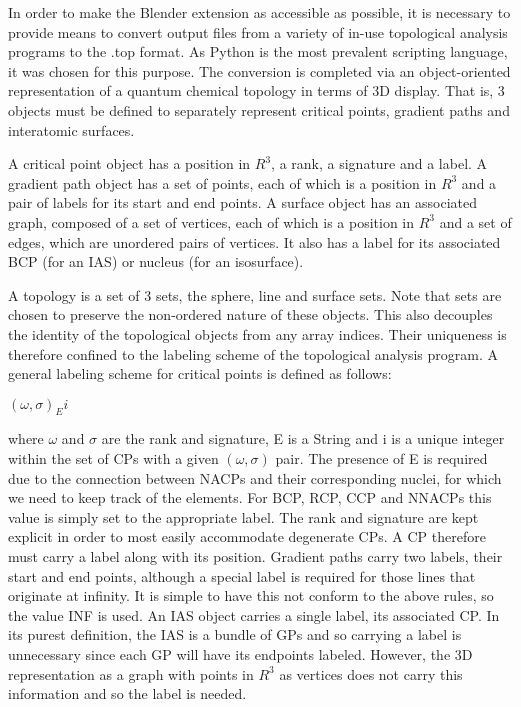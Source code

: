 \documentclass{tufte-book}
\begin{document}

In order to make the Blender extension as accessible as possible, it is necessary to provide means to convert output files from a variety of in-use topological analysis programs to the .top format.
As Python is the most prevalent scripting language, it was chosen for this purpose.
The conversion is completed via an object-oriented representation of a quantum chemical topology in terms of 3D display. That is, 3 objects must be defined to separately represent critical points, gradient paths and interatomic surfaces.

A critical point object has a position in $R^3$, a rank, a signature and a label.
A gradient path object has a set of points, each of which is a position in $R^3$ and a pair of labels for its start and end points.
A surface object has an associated graph, composed of a set of vertices, each of which is a position in $R^3$ and a set of edges, which are unordered pairs of vertices. It also has a label for its associated BCP (for an IAS) or nucleus (for an isosurface).

A topology is a set of 3 sets, the sphere, line and surface sets. Note that sets are chosen to preserve the non-ordered nature of these objects. This also decouples the identity of the topological objects from any array indices. Their uniqueness is therefore confined to the labeling scheme of the topological analysis program.
A general labeling scheme for critical points is defined as follows:

$(\omega,\sigma)_Ei$

where $\omega$ and $\sigma$ are the rank and signature, E is a String and i is a unique integer within the set of CPs with a given $(\omega,\sigma)$ pair. The presence of E is required due to the connection between NACPs and their corresponding nuclei, for which we need to keep track of the elements. For BCP, RCP, CCP and NNACPs this value is simply set to the appropriate label. The rank and signature are kept explicit in order to most easily accommodate degenerate CPs. A CP therefore must carry a label along with its position. Gradient paths carry two labels, their start and end points, although a special label is required for those lines that originate at infinity. It is simple to have this not conform to the above rules, so the value INF is used.
An IAS object carries a single label, its associated CP. In its purest definition, the IAS is a bundle of GPs and so carrying a label is unnecessary since each GP will have its endpoints labeled. However, the 3D representation as a graph with points in $R^3$ as vertices does not carry this information and so the label is needed.
\end{document}
